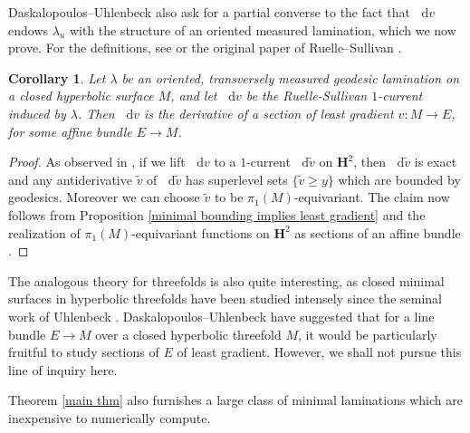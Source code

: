 \documentclass[reqno,12pt,letterpaper]{amsart}
\newcommand{\Hyp}{\mathbf H}
\newcommand*\dif{\mathop{}\!\mathrm{d}}
\newtheorem{corollary}[theorem]{Corollary}
\theoremstyle{definition}
\numberwithin{equation}{section}
\begin{document}
Daskalopoulos--Uhlenbeck also ask for \cite[Problem 9.7]{daskalopoulos2020transverse} a partial converse to the fact that $\dif v$ endows $\lambda_u$ with the structure of an oriented measured lamination, which we now prove.
For the definitions, see \cite[\S8]{daskalopoulos2020transverse} or the original paper of Ruelle--Sullivan \cite{Ruelle75}.

\begin{corollary}\label{ruelle sullivan antiderivative}
Let $\lambda$ be an oriented, transversely measured geodesic lamination on a closed hyperbolic surface $M$, and let $\dif v$ be the Ruelle-Sullivan $1$-current induced by $\lambda$.
Then $\dif v$ is the derivative of a section of least gradient $v: M \to E$, for some affine bundle $E \to M$.
\end{corollary}
\begin{proof}
As observed in \cite[\S9]{daskalopoulos2020transverse}, if we lift $\dif v$ to a $1$-current $\dif \tilde v$ on $\Hyp^2$, then $\dif \tilde v$ is exact and any antiderivative $\tilde v$ of $\dif \tilde v$ has superlevel sets $\{\tilde v \geq y\}$ which are bounded by geodesics.
Moreover we can choose $\tilde v$ to be $\pi_1(M)$-equivariant.
The claim now follows from Proposition \ref{minimal bounding implies least gradient} and the realization of $\pi_1(M)$-equivariant functions on $\Hyp^2$ as sections of an affine bundle \cite[\S4]{daskalopoulos2020transverse}.
\end{proof}

The analogous theory for threefolds is also quite interesting, as closed minimal surfaces in hyperbolic threefolds have been studied intensely since the seminal work of Uhlenbeck \cite{Uhlenbeck1983ClosedMS}.
Daskalopoulos--Uhlenbeck have suggested \cite[Problem 9.13]{daskalopoulos2020transverse} that for a line bundle $E \to M$ over a closed hyperbolic threefold $M$, it would be particularly fruitful to study sections of $E$ of least gradient.
However, we shall not pursue this line of inquiry here.

Theorem \ref{main thm} also furnishes a large class of minimal laminations which are inexpensive to numerically compute.
\end{document}

